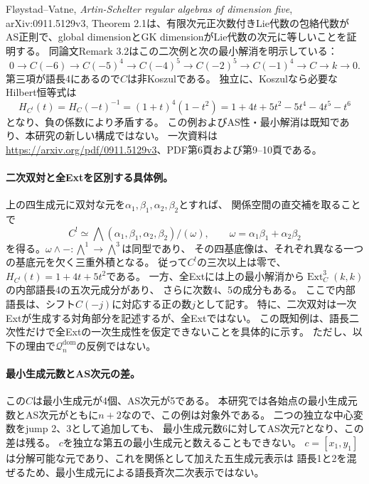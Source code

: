 \documentclass[11pt,a4paper]{ltjsarticle}
\newcommand{\Ext}{\operatorname{Ext}}
\begin{document}
Fl\o ystad--Vatne, \emph{Artin-Schelter regular algebras of dimension five},
arXiv:0911.5129v3, Theorem 2.1は、有限次元正次数付きLie代数の包絡代数が
AS正則で、global dimensionとGK dimensionがLie代数の次元に等しいことを証明する。
同論文Remark 3.2はこの二次例と次の最小解消を明示している：
\[
0\longrightarrow C(-6)\longrightarrow C(-5)^4\longrightarrow C(-4)^5
\longrightarrow C(-2)^5\longrightarrow C(-1)^4\longrightarrow C
\longrightarrow k\longrightarrow0.
\]
第三項が語長4にあるので$C$は非Koszulである。
独立に、Koszulなら必要なHilbert恒等式は
\[
 H_{C^!}(t)=H_C(-t)^{-1}
 =(1+t)^4(1-t^2)
 =1+4t+5t^2-5t^4-4t^5-t^6
\]
となり、負の係数により矛盾する。
この例およびAS性・最小解消は既知であり、本研究の新しい構成ではない。
一次資料は\url{https://arxiv.org/pdf/0911.5129v3}、PDF第6頁および第9--10頁である。

\paragraph{二次双対と全Extを区別する具体例。}
上の四生成元に双対な元を$\alpha_1,\beta_1,\alpha_2,\beta_2$とすれば、
関係空間の直交補を取ることで
\[
 C^!\simeq
 \bigwedge(\alpha_1,\beta_1,\alpha_2,\beta_2)/
 (\omega),\qquad
 \omega=\alpha_1\beta_1+\alpha_2\beta_2
\]
を得る。$\omega\wedge-:\bigwedge^1\to\bigwedge^3$は同型であり、
その四基底像は、それぞれ異なる一つの基底元を欠く三重外積となる。
従って$C^!$の三次以上は零で、$H_{C^!}(t)=1+4t+5t^2$である。
一方、全Extには上の最小解消から$\Ext_C^3(k,k)$の内部語長4の五次元成分があり、
さらに次数4、5の成分もある。
ここで内部語長は、シフト$C(-j)$に対応する正の数$j$として記す。
特に、二次双対は一次Extが生成する対角部分を記述するが、全Extではない。
この既知例は、語長二次性だけで全Extの一次生成性を仮定できないことを具体的に示す。
ただし、以下の理由で$\mathcal Q_n^{\mathrm{dom}}$の反例ではない。

\paragraph{最小生成元数とAS次元の差。}
この$C$は最小生成元が4個、AS次元が5である。
本研究では各始点の最小生成元数とAS次元がともに$n+2$なので、この例は対象外である。
二つの独立な中心変数をjump 2、3として追加しても、
最小生成元数6に対してAS次元7となり、この差は残る。
$c$を独立な第五の最小生成元と数えることもできない。
$c=[x_1,y_1]$は分解可能な元であり、これを関係として加えた五生成元表示は
語長1と2を混ぜるため、最小生成元による語長斉次二次表示ではない。
\end{document}
